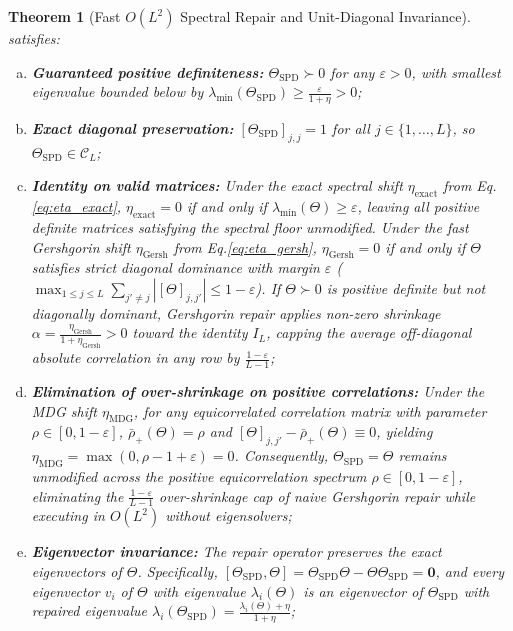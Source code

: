 \documentclass[default,sn-mathphys,Numbered]{sn-jnl}
\theoremstyle{thmstyleone}
\newtheorem{theorem}{Theorem}
\theoremstyle{thmstylethree}
\theoremstyle{thmstyletwo}
\newcommand{\eqnref}[1]{\eqref{#1}}
\begin{document}
\begin{theorem}[Fast $O(L^2)$ Spectral Repair and Unit-Diagonal Invariance]
\begin{equation}
\end{equation}
satisfies:
\begin{enumerate}[(a)]
    \item[(a)] \textbf{Guaranteed positive definiteness:} $\Theta_{\mathrm{SPD}} \succ 0$ for any $\varepsilon > 0$, with smallest eigenvalue bounded below by $\lambda_{\min}(\Theta_{\mathrm{SPD}}) \ge \frac{\varepsilon}{1 + \eta} > 0$;
    \item[(b)] \textbf{Exact diagonal preservation:} $[\Theta_{\mathrm{SPD}}]_{j, j} = 1$ for all $j \in \{1, \ldots, L\}$, so $\Theta_{\mathrm{SPD}} \in \mathcal{C}_L$;
    \item[(c)] \textbf{Identity on valid matrices:} Under the exact spectral shift $\eta_{\mathrm{exact}}$ from Eq.\eqnref{eq:eta_exact}, $\eta_{\mathrm{exact}} = 0$ if and only if $\lambda_{\min}(\Theta) \ge \varepsilon$, leaving all positive definite matrices satisfying the spectral floor unmodified. Under the fast Gershgorin shift $\eta_{\mathrm{Gersh}}$ from Eq.\eqnref{eq:eta_gersh}, $\eta_{\mathrm{Gersh}} = 0$ if and only if $\Theta$ satisfies strict diagonal dominance with margin $\varepsilon$ ($\max_{1 \le j \le L} \sum_{j' \neq j} |[\Theta]_{j, j'}| \le 1 - \varepsilon$). If $\Theta \succ 0$ is positive definite but not diagonally dominant, Gershgorin repair applies non-zero shrinkage $\alpha = \frac{\eta_{\mathrm{Gersh}}}{1 + \eta_{\mathrm{Gersh}}} > 0$ toward the identity $I_L$, capping the average off-diagonal absolute correlation in any row by $\frac{1-\varepsilon}{L-1}$;
    \item[(d)] \textbf{Elimination of over-shrinkage on positive correlations:} Under the MDG shift $\eta_{\mathrm{MDG}}$, for any equicorrelated correlation matrix with parameter $\rho \in [0, 1 - \varepsilon]$, $\bar{\rho}_+(\Theta) = \rho$ and $[\Theta]_{j, j'} - \bar{\rho}_+(\Theta) \equiv 0$, yielding $\eta_{\mathrm{MDG}} = \max(0, \rho - 1 + \varepsilon) = 0$. Consequently, $\Theta_{\mathrm{SPD}} = \Theta$ remains unmodified across the positive equicorrelation spectrum $\rho \in [0, 1 - \varepsilon]$, eliminating the $\frac{1-\varepsilon}{L-1}$ over-shrinkage cap of naive Gershgorin repair while executing in $O(L^2)$  without eigensolvers;
    \item[(e)] \textbf{Eigenvector invariance:} The repair operator preserves the exact eigenvectors of $\Theta$. Specifically, $[\Theta_{\mathrm{SPD}}, \Theta] = \Theta_{\mathrm{SPD}} \Theta - \Theta \Theta_{\mathrm{SPD}} = \bm{0}$, and every eigenvector $v_i$ of $\Theta$ with eigenvalue $\lambda_i(\Theta)$ is an eigenvector of $\Theta_{\mathrm{SPD}}$ with repaired eigenvalue $\lambda_i(\Theta_{\mathrm{SPD}}) = \frac{\lambda_i(\Theta) + \eta}{1 + \eta}$;

\end{enumerate}
\end{theorem}
\end{document}
